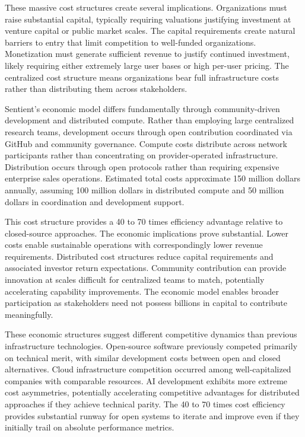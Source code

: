 These massive cost structures create several implications. Organizations must raise substantial capital, typically requiring valuations justifying investment at venture capital or public market scales. The capital requirements create natural barriers to entry that limit competition to well-funded organizations. Monetization must generate sufficient revenue to justify continued investment, likely requiring either extremely large user bases or high per-user pricing. The centralized cost structure means organizations bear full infrastructure costs rather than distributing them across stakeholders.

Sentient's economic model differs fundamentally through community-driven development and distributed compute. Rather than employing large centralized research teams, development occurs through open contribution coordinated via GitHub and community governance. Compute costs distribute across network participants rather than concentrating on provider-operated infrastructure. Distribution occurs through open protocols rather than requiring expensive enterprise sales operations. Estimated total costs approximate 150 million dollars annually, assuming 100 million dollars in distributed compute and 50 million dollars in coordination and development support.

This cost structure provides a 40 to 70 times efficiency advantage relative to closed-source approaches. The economic implications prove substantial. Lower costs enable sustainable operations with correspondingly lower revenue requirements. Distributed cost structures reduce capital requirements and associated investor return expectations. Community contribution can provide innovation at scales difficult for centralized teams to match, potentially accelerating capability improvements. The economic model enables broader participation as stakeholders need not possess billions in capital to contribute meaningfully.

These economic structures suggest different competitive dynamics than previous infrastructure technologies. Open-source software previously competed primarily on technical merit, with similar development costs between open and closed alternatives. Cloud infrastructure competition occurred among well-capitalized companies with comparable resources. AI development exhibits more extreme cost asymmetries, potentially accelerating competitive advantages for distributed approaches if they achieve technical parity. The 40 to 70 times cost efficiency provides substantial runway for open systems to iterate and improve even if they initially trail on absolute performance metrics.
